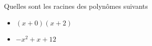 \bexo
Quelles sont les racines des polynômes suivants
\begin{itemize}
	\item $(x+0)(x+2)$
	\item $-x^2+x+12$
\end{itemize}
	\ifsolutions \else 
\vspace*{4cm}
\fi 
\eexo
{}
